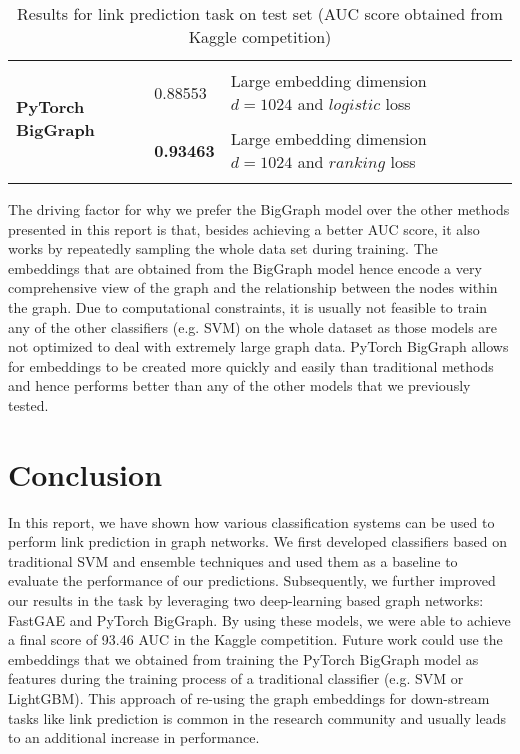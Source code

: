 \documentclass[11pt, oneside]{article}
\begin{document}
\begin{table}
\begin{tiny}
\begin{tabularx}{\textwidth}{p{3cm} p{5cm} p{2cm} p{6.5cm}}
\midrule
 \multirow{4}{*}{\textbf{PyTorch BigGraph}} & \begin{tabular}{@{}l @{}} $\eta = 0.001$, $loss = logistic$ \\ $n_{epochs}=50$, $d_{embedding}=1024$ \end{tabular} & 0.88553 & Large embedding dimension $d=1024$ and $logistic$ loss\\
\addlinespace[0.2cm]
   & \begin{tabular}{@{}l @{}} $\eta = 0.001$  $loss = ranking$  \\ $n_{epochs}=50$, $d_{embeddings}=1024$  \end{tabular} & \textbf{0.93463} & Large embedding dimension $d=1024$ and $ranking$ loss \\
 \addlinespace[0.1cm]
\bottomrule
\end{tabularx}
\caption{Results for link prediction task on test set (AUC score obtained from Kaggle competition)}
\label{tbl:results}
\end{tiny}
\end{table}
The driving factor for why we prefer the BigGraph model over the other methods presented in this report is that, besides achieving a better AUC score, it also works by repeatedly sampling the whole data set during training. The embeddings that are obtained from the BigGraph model hence encode a very comprehensive view of the graph and the relationship between the nodes within the graph. Due to computational constraints, it is usually not feasible to train any of the other classifiers (e.g. SVM) on the whole dataset as those models are not optimized to deal with extremely large graph data. PyTorch BigGraph allows for embeddings to be created more quickly and easily than traditional methods and hence performs better than any of the other models that we previously tested. 
\vspace{-10pt}
\section{Conclusion}
\vspace{-5pt}
In this report, we have shown how various classification systems can be used to perform link prediction in graph networks. We first developed classifiers based on traditional SVM and ensemble techniques and used them as a baseline to evaluate the performance of our predictions. Subsequently, we further improved our results in the task by leveraging two deep-learning based graph networks: FastGAE and PyTorch BigGraph. By using these models, we were able to achieve a final score of 93.46 AUC in the Kaggle competition.
\newline
Future work could use the embeddings that we obtained from training the PyTorch BigGraph model as features during the training process of a traditional classifier (e.g. SVM or LightGBM). This approach of re-using the graph embeddings for down-stream tasks like link prediction is common in the research community and usually leads to an additional increase in performance.
\printbibliography[heading=bibintoc]
\end{document}

